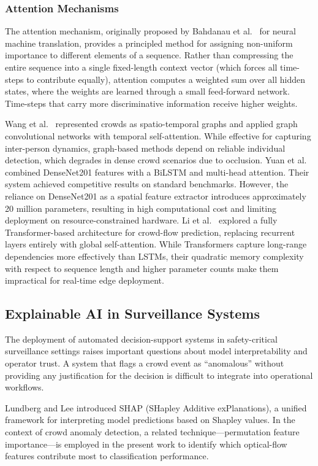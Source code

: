 \subsubsection{Attention Mechanisms}
The attention mechanism, originally proposed by Bahdanau et al.\ \cite{bahdanau2015neural} for neural machine translation, provides a principled method for assigning non-uniform importance to different elements of a sequence. Rather than compressing the entire sequence into a single fixed-length context vector (which forces all time-steps to contribute equally), attention computes a weighted sum over all hidden states, where the weights are learned through a small feed-forward network. Time-steps that carry more discriminative information receive higher weights.

Wang et al.\ \cite{wang2023anomaly} represented crowds as spatio-temporal graphs and applied graph convolutional networks with temporal self-attention. While effective for capturing inter-person dynamics, graph-based methods depend on reliable individual detection, which degrades in dense crowd scenarios due to occlusion. Yuan et al.\ \cite{yuan2024crba} combined DenseNet201 features with a BiLSTM and multi-head attention. Their system achieved competitive results on standard benchmarks. However, the reliance on DenseNet201 as a spatial feature extractor introduces approximately 20 million parameters, resulting in high computational cost and limiting deployment on resource-constrained hardware. Li et al.\ \cite{li2024transformer} explored a fully Transformer-based architecture for crowd-flow prediction, replacing recurrent layers entirely with global self-attention. While Transformers capture long-range dependencies more effectively than LSTMs, their quadratic memory complexity with respect to sequence length and higher parameter counts make them impractical for real-time edge deployment.

\subsection{Explainable AI in Surveillance Systems}

The deployment of automated decision-support systems in safety-critical surveillance settings raises important questions about model interpretability and operator trust. A system that flags a crowd event as ``anomalous'' without providing any justification for the decision is difficult to integrate into operational workflows.

Lundberg and Lee \cite{lundberg2017unified} introduced SHAP (SHapley Additive exPlanations), a unified framework for interpreting model predictions based on Shapley values. In the context of crowd anomaly detection, a related technique---permutation feature importance---is employed in the present work to identify which optical-flow features contribute most to classification performance.

